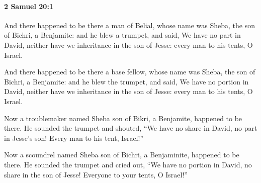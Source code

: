 		\paragraph{2 Samuel 20:1} %
			\label{2SAMUEL-20-1}

			And there happened to be there a man of Belial, whose name was Sheba, the son of Bichri, a Benjamite: and he blew a trumpet, and said, We have no part in David, neither have we inheritance in the son of Jesse: every man to his tents, O Israel.

			\begin{versebox}
					\item[BHS] 
					\item[ASV] And there happened to be there a base fellow, whose name was Sheba, the son of Bichri, a Benjamite: and he blew the trumpet, and said, We have no portion in David, neither have we inheritance in the son of Jesse: every man to his tents, O Israel.
					\item[NIV] Now a troublemaker named Sheba son of Bikri, a Benjamite, happened to be there. He sounded the trumpet and shouted, “We have no share in David, no part in Jesse’s son! Every man to his tent, Israel!”
					\item[NRSV] Now a scoundrel named Sheba son of Bichri, a Benjaminite, happened to be there. He sounded the trumpet and cried out, “We have no portion in David, no share in the son of Jesse! Everyone to your tents, O Israel!”
			\end{versebox}

